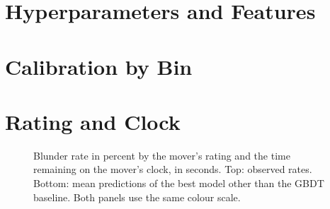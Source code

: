 \documentclass[11pt]{article}
\begin{document}



\clearpage
\appendix

\section{Hyperparameters and Features}

\begin{table}[htbp]\centering\footnotesize
{}
\caption{Hyperparameters of the networks of the fixed sequence, from their
configuration files. \emph{LR} is the peak learning rate. Values shared by
all of them are given below the table.}
\label{tab:settings}
\end{table}

\begin{table}[htbp]\centering\footnotesize
{}
\caption{Hand-crafted features: the inputs of  in addition
to the scalar context features, and of a network whose configuration includes
them.}
\label{tab:hand}
\end{table}

\section{Calibration by Bin}

\begin{table}[htbp]\centering\small
{}
\caption{Calibration by bin on the test set, for the best model and the GBDT
baseline. The bins of each model are formed from its own predicted
probabilities and have equal size. \emph{Predicted} is the mean predicted
probability in a bin, and \emph{observed} is the share of moves in the bin
that were blunders.}
\label{tab:calibration}
\end{table}

\iflook
\section{Rating and Clock}

\begin{figure}[htbp]\centering
{}

\medskip
{}
\caption{Blunder rate in percent by the mover's rating and the time remaining
on the mover's clock, in seconds. Top: observed rates. Bottom: mean
predictions of the best model other than the GBDT baseline. Both panels use
the same colour scale.}
\label{fig:grid-clock}
\end{figure}
\end{document}
